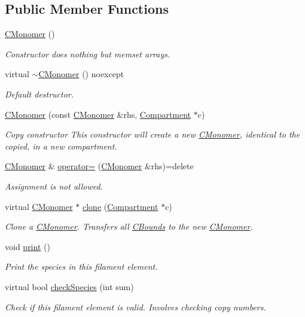 \subsection*{Public Member Functions}
\begin{DoxyCompactItemize}
\item 
\hyperlink{classCMonomer_a760d83db89ce412da21635983e18241d}{C\+Monomer} ()
\begin{DoxyCompactList}\small\item\em Constructor does nothing but memset arrays. \end{DoxyCompactList}\item 
virtual \hyperlink{classCMonomer_a6cfd5fad73b8f76fc45205839abe11bd}{$\sim$\+C\+Monomer} () noexcept
\begin{DoxyCompactList}\small\item\em Default destructor. \end{DoxyCompactList}\item 
\hyperlink{classCMonomer_aa4592f7871a18ec48697cd8d626d3c7b}{C\+Monomer} (const \hyperlink{classCMonomer}{C\+Monomer} \&rhs, \hyperlink{classCompartment}{Compartment} $\ast$c)
\begin{DoxyCompactList}\small\item\em Copy constructor This constructor will create a new \hyperlink{classCMonomer}{C\+Monomer}, identical to the copied, in a new compartment. \end{DoxyCompactList}\item 
\hyperlink{classCMonomer}{C\+Monomer} \& \hyperlink{classCMonomer_a6145f013c6830c4aded4fb5677f38054}{operator=} (\hyperlink{classCMonomer}{C\+Monomer} \&rhs)=delete
\begin{DoxyCompactList}\small\item\em Assignment is not allowed. \end{DoxyCompactList}\item 
virtual \hyperlink{classCMonomer}{C\+Monomer} $\ast$ \hyperlink{classCMonomer_adbb775dba38bc68856db9529826f9676}{clone} (\hyperlink{classCompartment}{Compartment} $\ast$c)
\begin{DoxyCompactList}\small\item\em Clone a \hyperlink{classCMonomer}{C\+Monomer}. Transfers all \hyperlink{classCBound}{C\+Bounds} to the new \hyperlink{classCMonomer}{C\+Monomer}. \end{DoxyCompactList}\item 
void \hyperlink{classCMonomer_a72138cb91d962aed900869f4096afd92}{print} ()
\begin{DoxyCompactList}\small\item\em Print the species in this filament element. \end{DoxyCompactList}\item 
virtual bool \hyperlink{classCMonomer_a7e8eb6f8475a8b2fe50e369a0ed0b0ab}{check\+Species} (int sum)
\begin{DoxyCompactList}\small\item\em Check if this filament element is valid. Involves checking copy numbers. \end{DoxyCompactList}\end{DoxyCompactItemize}
